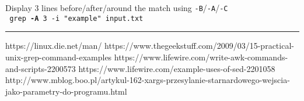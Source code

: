 \documentclass[8pt,landscape]{article}
\begin{document}
\begin{multicols}{3}
\vspace{0.2cm}
Display 3 lines before/after/around the match using \texttt{-B}/\texttt{-A}/\texttt{-C} \\
\texttt{
grep \textbf{-A} 3 -i "example" input.txt
}

\rule{0.3\linewidth}{0.25pt}
\footnotesize

\begin{thebibliography}{99}

 https://linux.die.net/man/
 https://www.thegeekstuff.com/2009/03/15-practical-unix-grep-command-examples
 https://www.lifewire.com/write-awk-commands-and-scripts-2200573
 https://www.lifewire.com/example-uses-of-sed-2201058
 http://www.mblog.boo.pl/artykul-162-xargs-przesylanie-starnardowego-wejscia-jako-parametry-do-programu.html

\end{thebibliography}

\end{multicols}
\end{document}
